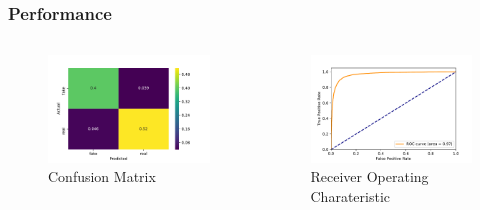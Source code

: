 \documentclass[aspectratio=1610, professionalfonts, 9pt]{beamer}
\begin{document}
  \begin{frame}
    \frametitle{Performance}
    \begin{columns}
      \begin{figure}
          \includegraphics[width=\textwidth]{pictures/bow/cnfsn_mtx_bow_best_nn.pdf}
          \caption{Confusion Matrix}
          \label{}
      \end{figure}

      \begin{figure}
          \includegraphics[width=\textwidth]{pictures/bow/roc_Hyperopt_bow_best_nn.pdf}
          \caption{Receiver Operating Charateristic}
          \label{}
      \end{figure}
    \end{columns}
  \end{frame}
\end{document}

